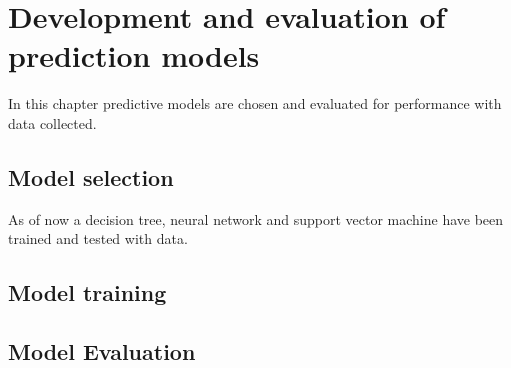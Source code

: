 \setlength{\footskip}{8mm}

\chapter{Development and evaluation of prediction models}
\label{ch:depm}

In this chapter predictive models are chosen and evaluated for performance with data collected.

\section{Model selection}
As of now a decision tree, neural network and support vector machine have been trained and tested with data.

\section{Model training}


\section{Model Evaluation}
